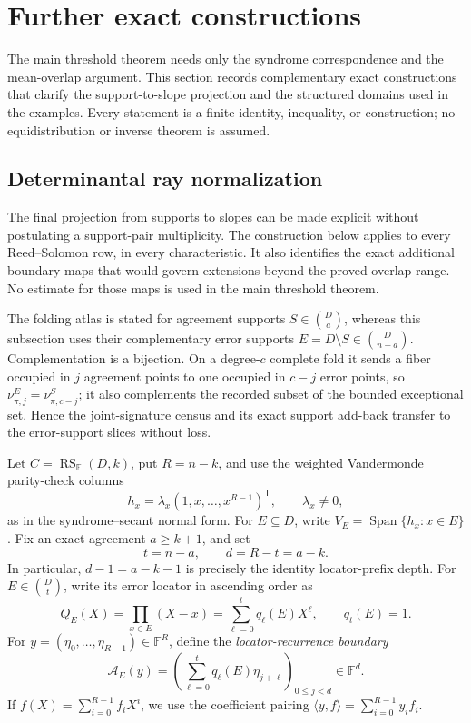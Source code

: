 \documentclass[11pt,a4paper]{amsart}
\numberwithin{equation}{section}
\theoremstyle{remark}
\DeclareMathOperator{\RS}{RS}
\DeclareMathOperator{\Span}{Span}
\newcommand{\F}{\mathbb F}
\begin{document}
\section{Further exact constructions}\label{sec:further-exact}

The main threshold theorem needs only the syndrome correspondence and the
mean-overlap argument.  This section records complementary exact
constructions that clarify the support-to-slope projection and the
structured domains used in the examples.  Every statement is a finite
identity, inequality, or construction; no equidistribution or inverse
theorem is assumed.

\subsection{Determinantal ray normalization}\label{drc:sec-determinantal-ray}

The final projection from supports to slopes can be made explicit without
postulating a support-pair multiplicity.  The construction below applies to
every Reed--Solomon row, in every characteristic.  It also identifies the
exact additional boundary maps that would govern extensions beyond the
proved overlap range.  No estimate for those maps is used in the main
threshold theorem.

The folding atlas is stated for agreement supports
\(S\in\binom Da\), whereas this subsection uses their complementary error
supports \(E=D\setminus S\in\binom D{n-a}\).  Complementation is a
bijection.  On a degree-\(c\) complete fold it sends a fiber occupied in
\(j\) agreement points to one occupied in \(c-j\) error points, so
\(\nu^E_{\pi,j}=\nu^S_{\pi,c-j}\); it also complements the recorded subset
of the bounded exceptional set.  Hence the joint-signature census and its
exact support add-back transfer to the error-support slices without loss.

Let \(C=\RS_\F(D,k)\), put \(R=n-k\), and use the weighted Vandermonde
parity-check columns
\[
 h_x=\lambda_x(1,x,\ldots,x^{R-1})^{\mathsf T},
 \qquad \lambda_x\ne0,
\]
as in the syndrome--secant normal form.  For \(E\subseteq D\), write
\(V_E=\Span\{h_x:x\in E\}\).  Fix an exact agreement \(a\ge k+1\), and set
\[
             t=n-a,\qquad d=R-t=a-k.
             \tag{DR0}\label{drc:eq-depth}
\]
In particular, \(d-1=a-k-1\) is precisely the identity locator-prefix
depth.  For \(E\in\binom Dt\), write its error locator in ascending order as
\[
 Q_E(X)=\prod_{x\in E}(X-x)=\sum_{\ell=0}^{t}q_\ell(E)X^\ell,
 \qquad q_t(E)=1.
\]
For \(y=(\eta_0,\ldots,\eta_{R-1})\in\F^R\), define the
\emph{locator-recurrence boundary}
\[
 \mathcal A_E(y)=
 \left(\sum_{\ell=0}^{t}q_\ell(E)\eta_{j+\ell}\right)_{0\le j<d}
 \in\F^d.
 \tag{DR1}\label{drc:eq-recurrence-boundary}
\]
If \(f(X)=\sum_{i=0}^{R-1}f_iX^i\), we use the coefficient pairing
\(
 \langle y,f\rangle=\sum_{i=0}^{R-1}y_if_i
\).
\end{document}
